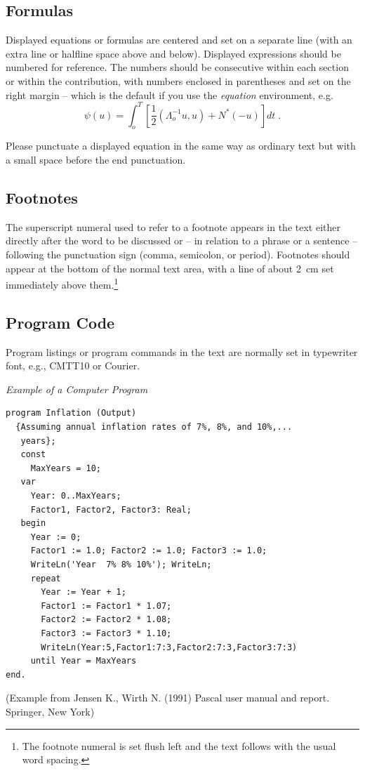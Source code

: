 \documentclass[runningheads]{llncs}
\begin{document}
\subsection{Formulas}

Displayed equations or formulas are centered and set on a separate
line (with an extra line or halfline space above and below). Displayed
expressions should be numbered for reference. The numbers should be
consecutive within each section or within the contribution,
with numbers enclosed in parentheses and set on the right margin --
which is the default if you use the \emph{equation} environment, e.g.
\begin{equation}
  \psi (u) = \int_{o}^{T} \left[\frac{1}{2}
  \left(\Lambda_{o}^{-1} u,u\right) + N^{\ast} (-u)\right] dt \;  .
\end{equation}

Please punctuate a displayed equation in the same way as ordinary
text but with a small space before the end punctuation.

\subsection{Footnotes}

The superscript numeral used to refer to a footnote appears in the text
either directly after the word to be discussed or -- in relation to a
phrase or a sentence -- following the punctuation sign (comma,
semicolon, or period). Footnotes should appear at the bottom of
the
normal text area, with a line of about 2~cm set
immediately above them.\footnote{The footnote numeral is set flush left
and the text follows with the usual word spacing.}

\subsection{Program Code}

Program listings or program commands in the text are normally set in
typewriter font, e.g., CMTT10 or Courier.

\medskip

\noindent
{\it Example of a Computer Program}
\begin{verbatim}
program Inflation (Output)
  {Assuming annual inflation rates of 7%, 8%, and 10%,...
   years};
   const
     MaxYears = 10;
   var
     Year: 0..MaxYears;
     Factor1, Factor2, Factor3: Real;
   begin
     Year := 0;
     Factor1 := 1.0; Factor2 := 1.0; Factor3 := 1.0;
     WriteLn('Year  7% 8% 10%'); WriteLn;
     repeat
       Year := Year + 1;
       Factor1 := Factor1 * 1.07;
       Factor2 := Factor2 * 1.08;
       Factor3 := Factor3 * 1.10;
       WriteLn(Year:5,Factor1:7:3,Factor2:7:3,Factor3:7:3)
     until Year = MaxYears
end.
\end{verbatim}
%
\noindent
{\small (Example from Jensen K., Wirth N. (1991) Pascal user manual and
report. Springer, New York)}
\end{document}

